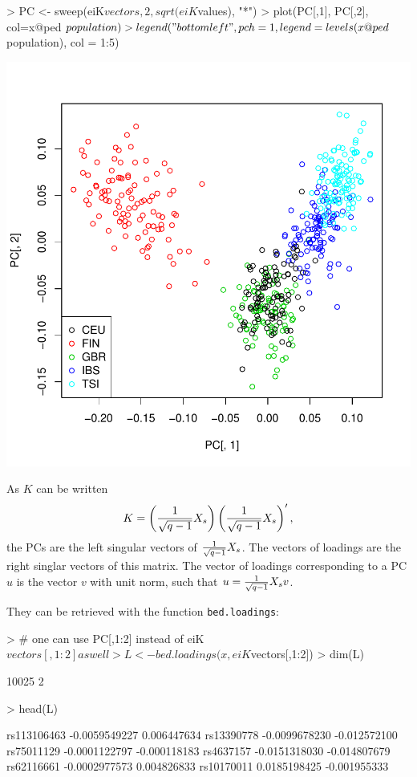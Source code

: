 \documentclass{article}
\renewenvironment{Schunk}{\vspace{\topsep}}{\vspace{\topsep}}
\begin{document}
\begin{center}
\begin{Schunk}
\begin{Sinput}
> PC <- sweep(eiK$vectors, 2, sqrt(eiK$values), "*")
> plot(PC[,1], PC[,2], col=x@ped$population)
> legend("bottomleft", pch = 1, legend = levels(x@ped$population), col = 1:5)
\end{Sinput}
\end{Schunk}
\includegraphics{gaston-032}
\end{center}

  As $K$ can be written
  \begin{equation*} 
    K = \left( {1 \over \sqrt{q-1}} X_s \right) \left( {1 \over \sqrt{q-1}} X_s \right)',
  \end{equation*}
  the PCs are the left singular vectors of ${1 \over \sqrt{q-1}} X_s$.
  The vectors of loadings are the right singlar vectors of this matrix. The vector of loadings 
  corresponding to a PC $u$ is the vector $v$ with unit norm, such that 
  $u = {1 \over \sqrt{q-1}} X_s v$.

  They can be retrieved with the function \verb!bed.loadings!:
\begin{Schunk}
\begin{Sinput}
> # one can use PC[,1:2] instead of eiK$vectors[,1:2] as well
> L <- bed.loadings(x, eiK$vectors[,1:2])
> dim(L)
\end{Sinput}
\begin{Soutput}
[1] 10025     2
\end{Soutput}
\begin{Sinput}
> head(L)
\end{Sinput}
\begin{Soutput}
                     [,1]         [,2]
rs113106463 -0.0059549227  0.006447634
rs13390778  -0.0099678230 -0.012572100
rs75011129  -0.0001122797 -0.000118183
rs4637157   -0.0151318030 -0.014807679
rs62116661  -0.0002977573  0.004826833
rs10170011   0.0185198425 -0.001955333
\end{Soutput}
\end{Schunk}
\end{document}
